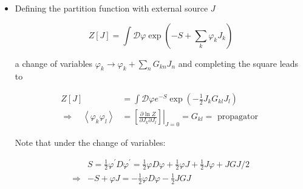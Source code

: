 \begin{itemize}
which is diagonal

\begin{equation}
\Rightarrow \quad G_{p,-q}=G_{p} \bar{\delta}_{p,q}=\frac{\bar{\delta}_{p, q}}{m^{2}+2 \sum_{\mu}\left(1-\cos p_{\mu}\right)}=\frac{\bar{\delta}_{p, q}}{m^{2}+4 \sum_{\mu} \sin ^{2} \frac{p_{\mu}}{2}}
\end{equation}

and restoring dimensional quantities

\begin{equation}
G_{p} \rightarrow a^{2} G(p) \quad G(p)=\frac{1}{m^{2}+a^{-2} \sum_{r}\left(2-2 \cos \left(a p_{\mu}\right)\right)} \xrightarrow{a \rightarrow 0} \frac{1}{\underbrace{m^{2}+p^{2}}_{\substack{\text { Euclidean free } \\ \text { propagator }}}}+\theta\left(a^{2}\right)
\end{equation}

  \item Defining the partition function with external source \(J\)

\begin{equation}
Z[J]=\int \mathcal{D} \varphi \exp \left(-S+\sum_{k} \varphi_{k} J_{k}\right)
\end{equation}

a change of variables \(\varphi_{k} \rightarrow \varphi_{k}+\sum_{n} G_{k n} J_{n}\) and completing the square leads to

\begin{equation}
\begin{aligned}
Z[J] & =\int \mathcal{D} \varphi e^{-S} \exp \left(-\frac{1}{2} J_{k} G_{k l} J_{l}\right) \\
\Rightarrow \quad\left\langle\varphi_{k} \varphi_{l}\right\rangle & =\left.\left[\frac{\partial \ln Z}{\partial J_{k} \partial J_{l}}\right]\right|_{J=0}=G_{k l}=\text { propagator }
\end{aligned}
\end{equation}

Note that under the change of variables:

\begin{equation}
\begin{aligned}
& S=\frac{1}{2} \varphi^{\prime} D \varphi^{\prime} =\frac{1}{2} \varphi D \varphi +\frac{1}{2} \varphi J+\frac{1}{2} J \varphi+J G J / 2 \\
 \Rightarrow&-S+\varphi J  =-\frac{1}{2} \varphi D \varphi-\frac{1}{2} J G J
\end{aligned}
\end{equation}


\end{itemize}
